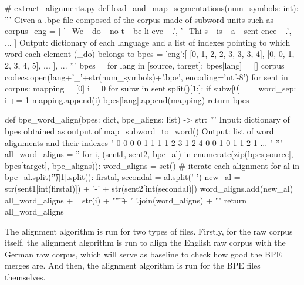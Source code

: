 \begin{python}
# extract_alignments.py
def load_and_map_segmentations(num_symbols: int):
  '''
  Given a .bpe file composed of the corpus made of subword units such as
  corpus_eng = [
    '_We _do _no t _be li eve _.',
    '_Thi s _is _a _sent ence _.',
    ...
  ]
  Output: dictionary of each language and 
  a list of indexes pointing to which word each element (_do) belongs to
  bpes = {
    'eng':[
      [0, 1, 2, 2, 3, 3, 3, 4],
      [0, 0, 1, 2, 3, 4, 5],
      ...
    ],
    ...
  } 
  '''
  bpes = {}
  for lang in [source, target]:
    bpes[lang] = []
    corpus = codecs.open(lang+'_'+str(num_symbols)+'.bpe', encoding='utf-8')
    for sent in corpus:
      mapping = [0]
      i = 0
      for subw in sent.split()[1:]:
        if subw[0] == word_sep:
          i += 1
        mapping.append(i)
      bpes[lang].append(mapping)
  return bpes

def bpe_word_align(bpes: dict, bpe_aligns: list) -> str:
  '''
  Input: dictionary of bpes obtained as output of map_subword_to_word()
  Output: list of word alignments and their indexes
    "
      0   0-0 0-1 1-1 1-2 3-1 2-4    0-0 1-0 1-1 2-1 \n
      ...
    "
  '''
  all_word_aligns = ''
  for i, (sent1, sent2, bpe_al) in enumerate(zip(bpes[source], bpes[target], bpe_aligns)):
    word_aligns = set()
    # iterate each alignment
    for al in bpe_al.split('\t')[1].split():
      firstal, secondal = al.split('-')
      new_al = str(sent1[int(firstal)]) + '-' + str(sent2[int(secondal)])
      word_aligns.add(new_al)
    all_word_aligns += str(i) + "\t" + ' '.join(word_aligns) + "\n"
  return all_word_aligns
\end{python}

The alignment algorithm is run for two types of files. Firstly, for the raw corpus itself, the alignment algorithm is run to align the English raw corpus with the German raw corpus, which will serve as baseline to check how good the BPE merges are. And then, the alignment algorithm is run for the BPE files themselves.

